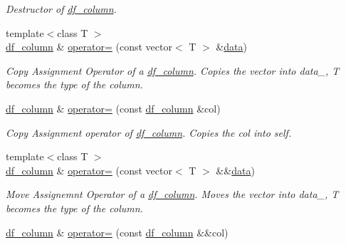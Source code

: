 \begin{DoxyCompactItemize}
\begin{DoxyCompactList}\small\item\em Destructor of \hyperlink{classboost_1_1numeric_1_1ublas_1_1df__column}{df\+\_\+column}. \end{DoxyCompactList}\item 
{\footnotesize template$<$class T $>$ }\\\hyperlink{classboost_1_1numeric_1_1ublas_1_1df__column}{df\+\_\+column} \& \hyperlink{classboost_1_1numeric_1_1ublas_1_1df__column_a528d33691118789591a55ca3c603e9fc}{operator=} (const vector$<$ T $>$ \&\hyperlink{classboost_1_1numeric_1_1ublas_1_1df__column_a4affb80868ab80aabf96f0be2fd613c7}{data})
\begin{DoxyCompactList}\small\item\em Copy Assignment Operator of a \hyperlink{classboost_1_1numeric_1_1ublas_1_1df__column}{df\+\_\+column}. Copies the vector into data\+\_\+, T becomes the type of the column. \end{DoxyCompactList}\item 
\hyperlink{classboost_1_1numeric_1_1ublas_1_1df__column}{df\+\_\+column} \& \hyperlink{classboost_1_1numeric_1_1ublas_1_1df__column_a692deb6563cbf93c09a1269c20d6d7c6}{operator=} (const \hyperlink{classboost_1_1numeric_1_1ublas_1_1df__column}{df\+\_\+column} \&col)
\begin{DoxyCompactList}\small\item\em Copy Assignment operator of \hyperlink{classboost_1_1numeric_1_1ublas_1_1df__column}{df\+\_\+column}. Copies the col into self. \end{DoxyCompactList}\item 
{\footnotesize template$<$class T $>$ }\\\hyperlink{classboost_1_1numeric_1_1ublas_1_1df__column}{df\+\_\+column} \& \hyperlink{classboost_1_1numeric_1_1ublas_1_1df__column_a69525a0546149c9c5ef3526639423b90}{operator=} (const vector$<$ T $>$ \&\&\hyperlink{classboost_1_1numeric_1_1ublas_1_1df__column_a4affb80868ab80aabf96f0be2fd613c7}{data})
\begin{DoxyCompactList}\small\item\em Move Assignemnt Operator of a \hyperlink{classboost_1_1numeric_1_1ublas_1_1df__column}{df\+\_\+column}. Moves the vector into data\+\_\+, T becomes the type of the column. \end{DoxyCompactList}\item 
\hyperlink{classboost_1_1numeric_1_1ublas_1_1df__column}{df\+\_\+column} \& \hyperlink{classboost_1_1numeric_1_1ublas_1_1df__column_a10798ea9fa787b7172a54379ce956984}{operator=} (const \hyperlink{classboost_1_1numeric_1_1ublas_1_1df__column}{df\+\_\+column} \&\&col)

\end{DoxyCompactItemize}
